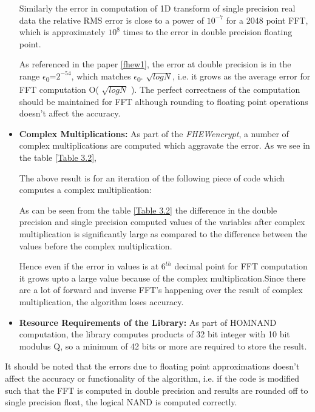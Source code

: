 \begin{itemize}

Similarly the error in computation of 1D transform of single precision real data the relative RMS error is close to a power of $10^{-7}$ for a 2048 point FFT, which is approximately $10^{8}$ times to the error in double precision floating point. 


As referenced in the paper \ref{fhew1}, the error at double precision is in the range $\epsilon$\textsubscript{0}=$2^{-54}$, which matches $\epsilon$\textsubscript{0}.
\begin{math}
\sqrt{log N}
\end{math}, i.e. it grows as the average error for FFT computation O(
\begin{math}
\sqrt{log N}
\end{math}
). The perfect correctness of the computation should be maintained for FFT although rounding to floating point operations doesn't affect the accuracy.
\item
\textbf{Complex Multiplications:}
As part of the \textit{FHEWencrypt}, a number of complex multiplications are computed which aggravate the error. As we see in the table \ref{Table 3.2},



The above result is for an iteration of the following piece of code which computes a complex multiplication:


\noindent As can be seen from the table \ref{Table 3.2} the difference in the double precision and single precision computed values of the variables after complex multiplication is significantly large as compared to the difference between the values before the complex multiplication.

\noindent Hence even if the error in values is at $6^{th}$ decimal point for FFT computation it grows upto a large value because of the complex multiplication.Since there are a lot of forward and inverse FFT's happening over the result of complex multiplication, the algorithm loses accuracy. 
\item
\textbf{Resource Requirements of the Library:} As part of HOMNAND computation, the library computes products of 32 bit integer with 10 bit modulus Q, so a minimum of 42 bits or more are required to store the result.
\end{itemize}

It should be noted that the errors due to floating point approximations doesn't affect the accuracy or functionality of the algorithm, i.e. if the code is modified such that the FFT is computed in double precision and results are rounded off to single precision float, the logical NAND is computed correctly.

